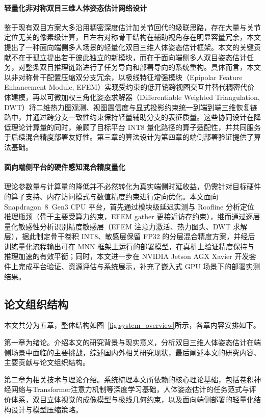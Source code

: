\paragraph{轻量化非对称双目三维人体姿态估计网络设计}
鉴于现有双目方案大多沿用稠密深度估计加关节回代的级联思路，存在大量与关节定位无关的像素级计算，且左右对称骨干结构在辅助视角存在明显容量冗余，本文提出了一种面向端侧多人场景的轻量化双目三维人体姿态估计框架。本文的关键贡献不在于孤立提出若干彼此独立的新模块，而在于面向端侧多人双目姿态估计任务，对整条双目推理链路进行了任务导向和部署导向的系统重构。具体而言，本文以非对称骨干配置压缩双分支冗余，以极线特征增强模块（Epipolar Feature Enhancement Module, EFEM）实现受约束的低开销跨视图交互并替代稠密代价体建模，再以可微加权三角化姿态求解器（Differentiable Weighted Triangulation, DWT）将二维热力图观测、视图置信度与显式投影约束统一到端到端三维恢复链路中，并通过跨分支一致性约束保持轻量辅助分支的表征质量。这些协同设计在降低理论计算量的同时，兼顾了目标平台 INT8 量化路径的算子适配性，并共同服务于后续混合精度部署友好性。第三章的算法设计为第四章的端侧部署验证提供了算法基础。

\paragraph{面向端侧平台的硬件感知混合精度量化}
理论参数量与计算量的降低并不必然转化为真实端侧时延收益，仍需针对目标硬件的算子支持、内存访问模式与数值精度约束进行定向优化。本文面向 Snapdragon~8~Gen3 CPU 平台，首先通过模块级延迟实测与 Roofline 分析定位推理瓶颈（骨干主要受算力约束，EFEM gather 更接近访存约束），继而通过逐层量化敏感性分析识别精度敏感层（EFEM 注意力激活、热力图头、DWT 求解层），据此制定骨干卷积 INT8、敏感层保留 FP32 的分层混合精度方案，并经后训练量化流程输出可在 MNN 框架上运行的部署模型，在真机上验证精度保持与推理加速的有效平衡；同时，本文进一步在 NVIDIA Jetson AGX Xavier 开发套件上完成平台验证、资源评估与系统展示，补充了嵌入式 GPU 场景下的部署实测结果。

\subsection{论文组织结构}
本文共分为五章，整体结构如图~\ref{fig:system_overview}所示，各章内容安排如下。

第一章为绪论。介绍本文的研究背景与现实意义，分析双目三维人体姿态估计在端侧场景中面临的主要挑战，综述国内外相关研究现状，最后阐述本文的研究内容、主要贡献与论文组织结构。

第二章为相关技术与理论介绍。系统梳理本文所依赖的核心理论基础，包括卷积神经网络与Transformer注意力机制等深度学习基础，人体姿态估计的任务范式与评价体系，双目立体视觉的成像模型与极线几何约束，以及面向端侧部署的轻量化结构设计与模型压缩策略。

